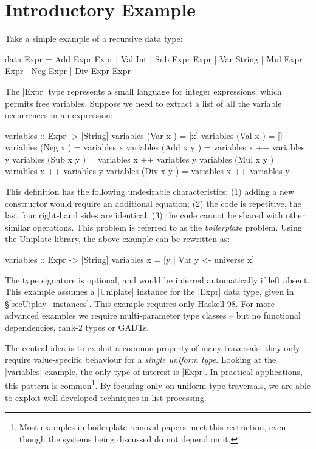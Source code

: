 \section{Introductory Example}
\label{secU:intro}

Take a simple example of a recursive data type:

\begin{code}
data Expr  =  Add  Expr  Expr  |  Val  Int
           |  Sub  Expr  Expr  |  Var  String
           |  Mul  Expr  Expr  |  Neg  Expr
           |  Div  Expr  Expr
\end{code}

The |Expr| type represents a small language for integer expressions, which permits free variables. Suppose we need to extract a list of all the variable occurrences in an expression:

\begin{onepage}
\begin{code}
variables :: Expr -> [String]
variables (Var  x    ) = [x]
variables (Val  x    ) = []
variables (Neg  x    ) = variables x
variables (Add  x y  ) = variables x ++ variables y
variables (Sub  x y  ) = variables x ++ variables y
variables (Mul  x y  ) = variables x ++ variables y
variables (Div  x y  ) = variables x ++ variables y
\end{code}
\end{onepage}

This definition has the following undesirable characteristics: (1) adding a new constructor would require an additional equation; (2) the code is repetitive, the last four right-hand sides are identical; (3) the code cannot be shared with other similar operations. This problem is referred to as the \textit{boilerplate} problem. Using the Uniplate library, the above example can be rewritten as:

\begin{code}
variables :: Expr -> [String]
variables x = [y | Var y <- universe x]
\end{code}

The type signature is optional, and would be inferred automatically if left absent. This example assumes a |Uniplate| instance for the |Expr| data type, given in \S\ref{secU:play_instances}. This example requires only Haskell 98. For more advanced examples we require multi-parameter type classes -- but no functional dependencies, rank-2 types or GADTs.

The central idea is to exploit a common property of many traversals: they only require value-specific behaviour for a \textit{single uniform type}. Looking at the |variables| example, the only type of interest is |Expr|. In practical applications, this pattern is common\footnote{Most examples in boilerplate removal papers meet this restriction, even though the systems being discussed do not depend on it.}. By focusing only on uniform type traversals, we are able to exploit well-developed techniques in list processing.

